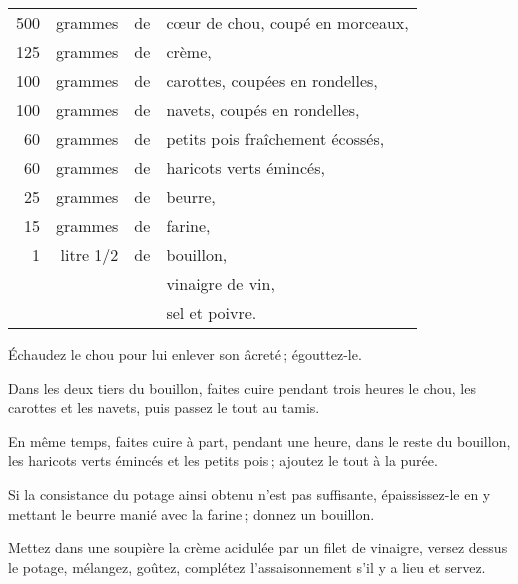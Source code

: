 \footnotesize
\begin{longtable}{rrrp{16em}}                                                    
    500 & grammes     & de & cœur de chou, coupé en morceaux,                                             \\
    125 & grammes     & de & crème,                                                                       \\
    100 & grammes     & de & carottes, coupées en rondelles,                                              \\
    100 & grammes     & de & navets, coupés en rondelles,                                                 \\
     60 & grammes     & de & petits pois fraîchement écossés,                                             \\
     60 & grammes     & de & haricots verts émincés,                                                      \\
     25 & grammes     & de & beurre,                                                                      \\
     15 & grammes     & de & farine,                                                                      \\
      1 & litre 1/2   & de & bouillon,                                                                    \\
        &             &    & vinaigre de vin,                                                             \\
        &             &    & sel et poivre.                                                               \\
\end{longtable}
\normalsize

Échaudez le chou pour lui enlever son âcreté ; égouttez-le.

Dans les deux tiers du bouillon, faites cuire pendant trois heures le chou, les
carottes et les navets, puis passez le tout au tamis.

En même temps, faites cuire à part, pendant une heure, dans le reste du
bouillon, les haricots verts émincés et les petits pois ; ajoutez le tout à la
purée.

Si la consistance du potage ainsi obtenu n'est pas suffisante, épaississez-le
en y mettant le beurre manié avec la farine ; donnez un bouillon.

Mettez dans une soupière la crème acidulée par un filet de vinaigre, versez
dessus le potage, mélangez, goûtez, complétez l'assaisonnement s'il y a lieu et
servez.

